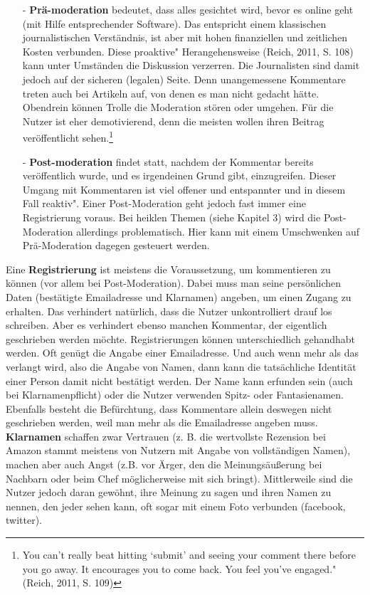 \begin{itemize}
\item[-] {\bfseries Prä-moderation} bedeutet, dass alles gesichtet wird, bevor es online geht (mit Hilfe entsprechender Software). Das entspricht einem klassischen journalistischen Verständnis, ist aber mit hohen finanziellen und zeitlichen Kosten verbunden. Diese \glqq proaktive" Herangehensweise (Reich, 2011, S. 108) kann unter Umständen die Diskussion verzerren. Die Journalisten sind damit jedoch auf der sicheren (legalen) Seite. Denn unangemessene Kommentare treten auch bei Artikeln auf, von denen es man nicht gedacht hätte. Obendrein können \glqq Trolle\grqq\- die Moderation stören oder umgehen. Für die Nutzer ist  eher demotivierend, denn die meisten wollen ihren Beitrag veröffentlicht sehen.\footnote{\glqq You can’t really beat hitting ‘submit’ and seeing your comment there before you go
away. It encourages you to come back. You feel you’ve engaged." (Reich, 2011, S. 109)}
\item[-] {\bfseries Post-moderation} findet statt, nachdem der Kommentar bereits veröffentlich wurde, und es irgendeinen Grund gibt, einzugreifen. Dieser Umgang mit Kommentaren ist viel offener und entspannter und in diesem Fall \glqq reaktiv". Einer Post-Moderation geht jedoch fast immer eine Registrierung voraus. Bei heiklen Themen (siehe Kapitel 3) wird die Post-Moderation allerdings problematisch. Hier kann mit einem Umschwenken auf Prä-Moderation dagegen gesteuert werden.
\end{itemize}
Eine {\bfseries Registrierung} ist meistens die Voraussetzung, um kommentieren zu können (vor allem bei Post-Moderation). Dabei muss man seine persönlichen Daten (be\-stä\-tig\-te Emailadresse und Klarnamen) angeben, um einen Zugang zu erhalten. Das verhindert natürlich, dass die Nutzer unkontrolliert drauf los schreiben. Aber es verhindert ebenso manchen Kommentar, der eigentlich geschrieben werden möchte. 
Registrierungen können unterschiedlich gehandhabt werden. Oft genügt die Angabe einer Emailadresse. Und auch wenn mehr als das verlangt wird, also die Angabe von Namen, dann kann die tatsächliche Identität einer Person damit nicht bestätigt werden. Der Name kann erfunden sein (auch bei Klarnamenpflicht) oder die Nutzer verwenden Spitz- oder Fantasienamen. Ebenfalls besteht die Befürchtung, dass Kommentare allein deswegen nicht geschrieben werden, weil man mehr als die Emailadresse angeben muss. 
{\bfseries Klarnamen} schaffen zwar Vertrauen (z. B. die wertvollste Rezension bei Amazon stammt meistens von Nutzern mit Angabe von vollständigen Namen), machen aber auch Angst (z.B. vor Ärger, den die Meinungsäußerung bei Nachbarn oder beim Chef möglicherweise mit sich bringt). Mittlerweile sind die Nutzer jedoch daran gewöhnt, ihre Meinung zu sagen und ihren Namen zu nennen, den jeder sehen kann, oft sogar mit einem Foto verbunden (facebook, twitter). 


